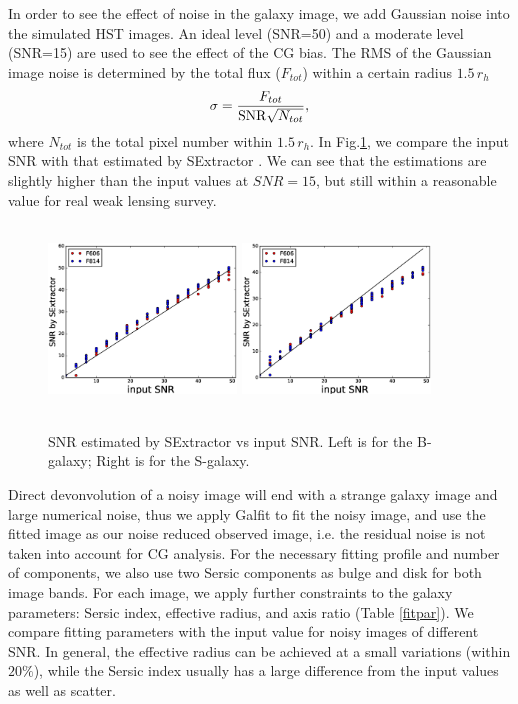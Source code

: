 \documentclass[useAMS,usenatbib]{mn2e}
\newcommand{\be}{\begin{equation}}
\newcommand{\ee}{\end{equation}}
\begin{document}
In order to see the effect of noise in the galaxy image, we add
Gaussian noise into the simulated HST images. An ideal level (SNR=50)
and a moderate level (SNR=15) are used to see the effect of the CG
bias. The RMS of the Gaussian image noise is determined by the total
flux ($F_{tot}$) within a certain radius $1.5\,r_h$
%
\be
\sigma = {F_{tot} \over {\rm SNR} \sqrt{N_{tot}} },
\ee
%
where $N_{tot}$ is the total pixel number within $1.5\,r_h$.  In
Fig.\ref{fig:ests2n}, we compare the input SNR with that estimated by
SExtractor \citep{1996A&AS..117..393B}. We can see that the
estimations are slightly higher than the input values at $SNR=15$, but
still within a reasonable value for real weak lensing survey.
%
\begin{figure}
\centerline{\includegraphics[height=5cm,width=5.0cm]{zs2ncB.eps}
\includegraphics[height=5cm,width=5.0cm]{zs2ncS.eps}}
\caption{SNR estimated by SExtractor vs input SNR. Left is for the
  B-galaxy; Right is for the S-galaxy.}
\label{fig:ests2n}
\end{figure}
%

Direct devonvolution of a noisy image will end with a strange galaxy
image and large numerical noise, thus we apply Galfit
\citep{2010AJ....139.2097P} to fit the noisy image, and use the fitted
image as our noise reduced observed image, i.e. the residual noise is
not taken into account for CG analysis. For the necessary fitting
profile and number of components, we also use two Sersic components as
bulge and disk for both image bands. For each image, we apply further
constraints to the galaxy parameters: Sersic index, effective radius,
and axis ratio (Table \ref{fitpar}). We compare fitting parameters
with the input value for noisy images of different SNR. In general,
the effective radius can be achieved at a small variations (within
$20\%$), while the Sersic index usually has a large difference from
the input values as well as scatter.
\end{document}
